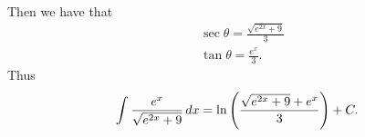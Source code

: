 \documentclass[]{ximera}
\begin{document}
\begin{problem}
\begin{freeResponse}
	Then we have that
		\begin{align*}
		&\sec \theta = \frac{\sqrt{e^{2x}+9}}{3} \\
		&\tan \theta = \frac{e^x}{3}.
		\end{align*}
	Thus
		\[
		\int \frac{e^x}{\sqrt{e^{2x}+9}} \,d x = \ln \left( \frac{\sqrt{e^{2x}+9} + e^x}{3} \right) + C.
		\]
	\end{freeResponse}

\end{problem}

\begin{instructorNotes}

\end{instructorNotes}
\end{document}
